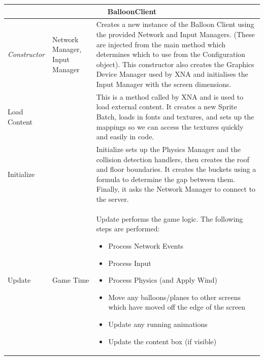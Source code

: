 \begin{table}
\begin{tabular}{|p{2.6cm}|p{3.6cm}|p{9.4cm}|}
\hline
\multicolumn{3}{|c|}{BalloonClient} \\ \hline
\emph{Constructor} & Network Manager, Input Manager & 
Creates a new instance of the Balloon Client using the provided Network and 
Input Managers. (These are injected from the main method which determines which
to use from the Configuration object). This constructor also creates the 
Graphics Device Manager used by XNA and initialises the Input Manager with the
screen dimensions. \\ \hline

Load Content & & 
This is a method called by XNA and is used to load external content. It creates
a new Sprite Batch, loads in fonts and textures, and sets up the mappings so we
can access the textures quickly and easily in code. \\ \hline

Initialize & &
Initialize sets up the Physics Manager and the collision detection handlers, 
then creates the roof and floor boundaries. It creates the buckets using a 
formula to determine the gap between them. Finally, it asks the Network Manager
to connect to the server. \\ \hline

Update & Game Time &
Update performs the game logic. \newline The following steps are performed:
\begin{itemize}
	\item{Process Network Events}
	\item{Process Input}
	\item{Process Physics (and Apply Wind)}
	\item{Move any balloons/planes to other screens which have moved off the edge of the screen}
	\item{Update any running animations}
	\item{Update the content box (if visible)}
\end{itemize}
\\ \hline


\end{tabular}
\end{table}
